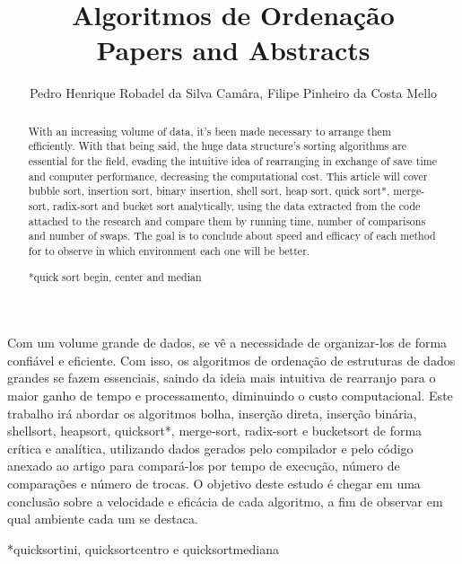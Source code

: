\documentclass[12pt]{article}
\title{Algoritmos de Ordenação\\ Papers and Abstracts}
\author{Pedro Henrique Robadel da Silva Camâra\inst{1}, Filipe Pinheiro da Costa Mello\inst{1}}
\begin{document}
 

\maketitle

\begin{abstract}
  
 With an increasing volume of data, it's been made necessary to arrange them efficiently. With that being said, the huge data structure's sorting algorithms are essential for the field, evading the intuitive idea of rearranging in exchange of save time and computer performance, decreasing the computational cost.
 This article will cover bubble sort, insertion sort, binary insertion, shell sort, heap sort, quick sort*, merge-sort, radix-sort and bucket sort analytically, using the data extracted from the code attached to the research and compare them by running time, number of comparisons and number of swaps. The goal is to conclude about speed and efficacy of each method for to observe in which environment each one will be better.
 
 *quick sort begin, center and median
  
\end{abstract}
     
\begin{resumo} 
  
  Com um volume grande de dados, se vê a necessidade de organizar-los de forma confiável e eficiente. Com isso, os algoritmos de ordenação de estruturas de dados grandes se fazem essenciais, saindo da ideia mais intuitiva de rearranjo para o maior ganho de tempo e processamento, diminuindo o custo computacional. 
  Este trabalho irá abordar os algoritmos bolha, inserção direta, inserção binária, shellsort, heapsort, quicksort*, merge-sort, radix-sort e bucketsort de forma crítica e analítica, utilizando dados gerados pelo compilador e pelo código anexado ao artigo para compará-los por tempo de execução, número de comparações e número de trocas. O objetivo deste estudo é chegar em uma conclusão sobre a velocidade e eficácia de cada algoritmo, a fim de observar em qual ambiente cada um se destaca.

  *quicksortini, quicksortcentro e quicksortmediana
\end{resumo} 






\end{document}
